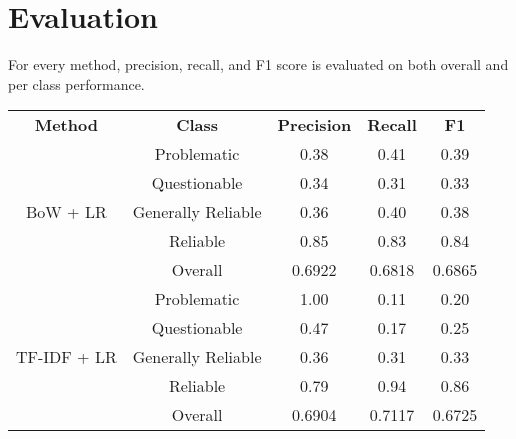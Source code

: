 \chapter{Evaluation}
\label{cha:5}


For every method, precision, recall, and F1 score is evaluated on both overall and per class performance.

\begin{table}[htbp]
    \centering
    \footnotesize
    \begin{tabular}{| c | c | c | c | c |}
        \hline                            \textbf{Method}  & \textbf{Class}     & \textbf{Precision} & \textbf{Recall} & \textbf{F1}     \\\cline{1-5}
        \multirow{5}{*}{BoW + LR}                          & Problematic        & 0.38               & 0.41            & 0.39            \\
                                                           & Questionable       & 0.34               & 0.31            & 0.33            \\
                                                           & Generally Reliable & 0.36               & 0.40            & 0.38            \\
                                                           & Reliable           & 0.85               & 0.83            & 0.84            \\\cline{2-5}
                                                           & Overall            & 0.6922             & 0.6818          & 0.6865          \\
        \hline
        \multirow{5}{*}{TF-IDF + LR}                       & Problematic        & 1.00               & 0.11            & 0.20            \\
                                                           & Questionable       & 0.47               & 0.17            & 0.25            \\
                                                           & Generally Reliable & 0.36               & 0.31            & 0.33            \\
                                                           & Reliable           & 0.79               & 0.94            & 0.86            \\\cline{2-5}
                                                           & Overall            & 0.6904             & 0.7117          & 0.6725          \\
        \hline

\end{tabular}
\end{table}
